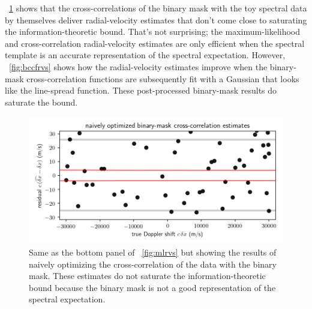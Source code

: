 \documentclass[modern]{aastex631}
\newcommand{\figref}[1]{\figurename~\ref{#1}}
\begin{document}
\figref{fig:bccfrvswrong} shows that the cross-correlations of the binary mask with the toy spectral data by themselves deliver radial-velocity estimates that don't come close to saturating the information-theoretic bound.
That's not surprising; the maximum-likelihood and cross-correlation radial-velocity estimates are only efficient when the spectral template is an accurate representation of the spectral expectation.
However, \figref{fig:bccfrvs} shows how the radial-velocity estimates improve when the binary-mask cross-correlation functions are subsequently fit with a Gaussian that looks like the line-spread function.
These post-processed binary-mask results do saturate the bound.

\begin{figure}[tp]
  \begin{mdframed}
    \begin{center}
    \includegraphics[width=\textwidth]{../notebook/bccfrvswrong.png}
    \end{center}
    \caption{Same as the bottom panel of \figref{fig:mlrvs} but showing the results of naively optimizing the cross-correlation of the data with the binary mask. These estimates do not saturate the information-theoretic bound because the binary mask is not a good representation of the spectral expectation.\label{fig:bccfrvswrong}}
  \end{mdframed}
\end{figure}%
\end{document}
